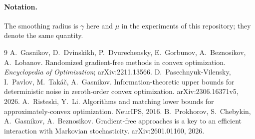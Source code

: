 \documentclass[10pt,a4paper]{article}
\theoremstyle{definition}\newtheorem{definition}{Definition}
\begin{document}
\paragraph{Notation.} The smoothing radius is $\gamma$ here and $\mu$ in the experiments of this repository; they denote the same quantity.

\begin{thebibliography}{9}\small
{} A.~Gasnikov, D.~Dvinskikh, P.~Dvurechensky, E.~Gorbunov, A.~Beznosikov, A.~Lobanov. Randomized gradient-free methods in convex optimization. \emph{Encyclopedia of Optimization}; arXiv:2211.13566.
 D.~Pasechnyuk-Vilensky, I.~Pavlov, M.~Takáč, A.~Gasnikov. Information-theoretic upper bounds for deterministic noise in zeroth-order convex optimization. arXiv:2306.16371v5, 2026.
 A.~Risteski, Y.~Li. Algorithms and matching lower bounds for approximately-convex optimization. NeurIPS, 2016.
 B.~Prokhorov, S.~Chebykin, A.~Gasnikov, A.~Beznosikov. Gradient-free approaches is a key to an efficient interaction with Markovian stochasticity. arXiv:2601.01160, 2026.
\end{thebibliography}
\end{document}
